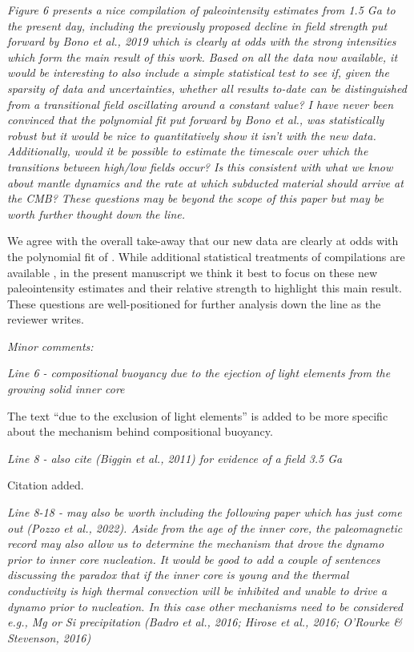 \documentclass[11pt, letterpaper]{article}
\begin{document}
\begin{flushleft}
\itshape
Figure 6 presents a nice compilation of paleointensity estimates from 1.5 Ga to the present day, including the previously proposed decline in field strength put forward by Bono et al., 2019 which is clearly at odds with the strong intensities which form the main result of this work. Based on all the data now available, it would be interesting to also include a simple statistical test to see if, given the sparsity of data and uncertainties, whether all results to-date can be distinguished from a transitional field oscillating around a constant value? I have never been convinced that the polynomial fit put forward by Bono et al., was statistically robust but it would be nice to quantitatively show it isn't with the new data. Additionally, would it be possible to estimate the timescale over which the transitions between high/low fields occur? Is this consistent with what we know about mantle dynamics and the rate at which subducted material should arrive at the CMB? These questions may be beyond the scope of this paper but may be worth further thought down the line.
\upshape

We agree with the overall take-away that our new data are clearly at odds with the polynomial fit of \cite{Bono2019a}. While additional statistical treatments of compilations are available \cite[e.g.][]{Biggin2015a}, in the present manuscript we think it best to focus on these new paleointensity estimates and their relative strength to highlight this main result. These questions are well-positioned for further analysis down the line as the reviewer writes.


\itshape
Minor comments:
\upshape

\textit{Line 6 - compositional buoyancy due to the ejection of light elements from the growing solid inner core}

The text ``due to the exclusion of light elements'' is added to be more specific about the mechanism behind compositional buoyancy.

\textit{Line 8 - also cite (Biggin et al., 2011) for evidence of a field 3.5 Ga}

Citation added. 

\textit{Line 8-18 - may also be worth including the following paper which has just come out (Pozzo et al., 2022). Aside from the age of the inner core, the paleomagnetic record may also allow us to determine the mechanism that drove the dynamo prior to inner core nucleation. It would be good to add a couple of sentences discussing the paradox that if the inner core is young and the thermal conductivity is high thermal convection will be inhibited and unable to drive a dynamo prior to nucleation. In this case other mechanisms need to be considered e.g., Mg or Si precipitation (Badro et al., 2016; Hirose et al., 2016; O'Rourke \& Stevenson, 2016)}


\end{flushleft}
\end{document}
